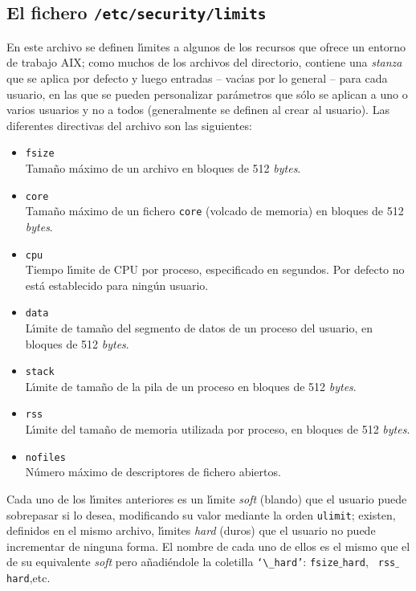 \subsection{El fichero {\tt /etc/security/limits}}
En este archivo se definen l\'{\i}mites a algunos de los recursos que ofrece un
entorno de trabajo AIX; como muchos de los archivos del directorio, contiene
una {\it stanza} que se aplica por defecto y luego entradas -- vac\'{\i}as por 
lo general -- para cada usuario, en las que se pueden personalizar par\'ametros 
que s\'olo se aplican a uno o varios usuarios y no a todos (generalmente se 
definen al crear al usuario). Las diferentes directivas del archivo son las
siguientes: 
\begin{itemize}
\item {\tt fsize}\\
Tama\~no m\'aximo de un archivo en bloques de 512 {\it bytes}.
\item {\tt core}\\
Tama\~no m\'aximo de un fichero {\tt core} (volcado de memoria) en bloques de 
512 {\it bytes}.
\item {\tt cpu}\\
Tiempo l\'{\i}mite de CPU por proceso, especificado en segundos. Por defecto no
est\'a establecido para ning\'un usuario.
\item {\tt data}\\
L\'{\i}mite de tama\~no del segmento de datos de un proceso del usuario, en 
bloques de 512 {\it bytes}.
\item {\tt stack}\\
L\'{\i}mite de tama\~no de la pila de un proceso en bloques de 512 {\it bytes}.
\item {\tt rss}\\
L\'{\i}mite del tama\~no de memoria utilizada por proceso, en bloques de 512 
{\it bytes}.
\item {\tt nofiles}\\
N\'umero m\'aximo de descriptores de fichero abiertos.
\end{itemize}
Cada uno de los l\'{\i}mites anteriores es un l\'{\i}mite {\it soft} (blando)
que el usuario puede sobrepasar si lo desea, modificando su valor mediante 
la orden {\tt ulimit}; existen, definidos en el mismo archivo, l\'{\i}mites {\it
hard} (duros) que el usuario no puede incrementar de ninguna forma. El nombre
de cada uno de ellos es el mismo que el de su equivalente {\it soft} pero 
a\~nadi\'endole la coletilla {\tt `$\_$hard'}: {\tt fsize$\_$hard}, {\tt 
rss$\_$hard},etc.\\
